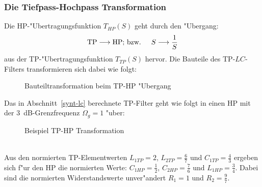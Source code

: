\subsubsection{Die Tiefpass-Hochpass Transformation}
Die HP-"Ubertragungsfunktion $T_{HP}(S)$ geht durch den "Ubergang:
\begin{eqnarray*}
{\rm TP}  \longrightarrow  {\rm HP}&\text{; bzw.    }& S  \longrightarrow \frac{1}{S}
\end{eqnarray*}
aus der TP-"Ubertragungsfunktion $T_{TP}(S)$ hervor. Die Bauteile
des TP-$LC$-Filters transformieren sich dabei wie folgt:
\begin{figure}[!htb]
\begin{center}
  \caption{Bauteiltransformation beim TP-HP "Ubergang}
\end{center}
\vspace*{-6mm}
\end{figure}
\bsp{} Das in Abschnitt~\ref{synt-lc} berechnete TP-Filter geht wie
folgt in einen HP mit der 3~dB-Grenzfrequenz $\Omega_g=1$ "uber:
\begin{figure}[!htb]
\begin{center}
  \caption{Beispiel TP-HP Transformation}
\end{center}
\vspace*{-6mm}
\end{figure}\\
Aus den normierten TP-Elementwerten $L_{1TP}=2$, $L_{2TP}=\frac{6}{7}$  und
$C_{1TP}=\frac{4}{3}$ ergeben sich f"ur den HP die normierten Werte:
$C_{1HP}=\frac{1}{2}$, $C_{2HP}=\frac{7}{6}$ und $L_{1HP}=\frac{3}{4}$.
Dabei sind die normierten Widerstandswerte unver"andert $R_1=1$
und $R_2=\frac{9}{7}$.
